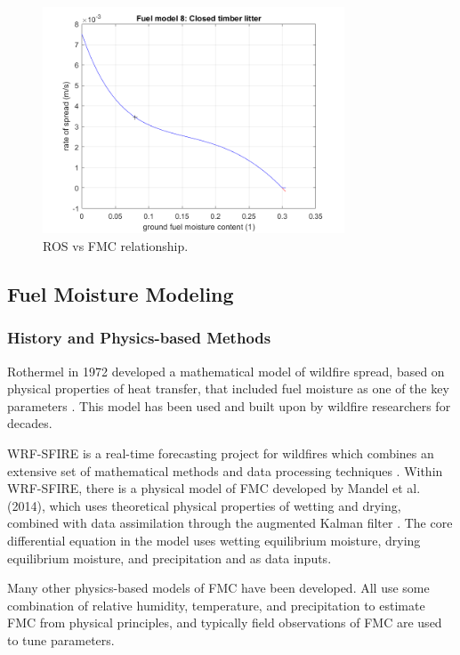 \documentclass[11pt]{article}%
\begin{document}
\begin{figure}[ht]
    \centering
    \includegraphics[width=0.8\textwidth]{images/fuel8_ros_fm.png}
    \caption{ROS vs FMC relationship.}
    \label{fig:fmc_ros_fmc}
\end{figure}

\subsection{Fuel Moisture Modeling}
\subsubsection{History and Physics-based Methods}

Rothermel in 1972 developed a mathematical model of wildfire spread, based on physical properties of heat transfer, that included fuel moisture as one of the key parameters \cite{Rothermel-1972-MMP}. This model has been used and built upon by wildfire researchers for decades. 

WRF-SFIRE is a real-time forecasting project for wildfires which combines an extensive set of mathematical methods and data processing techniques \cite{OpenWFM-2024-HTD}. Within WRF-SFIRE, there is a physical model of FMC developed by Mandel et al. (2014), which uses theoretical physical properties of wetting and drying, combined with data assimilation through the augmented Kalman filter \cite{Mandel-2014-RAA}. The core differential equation in the model uses wetting equilibrium moisture, drying equilibrium moisture, and precipitation and as data inputs.

Many other physics-based models of FMC have been developed. All use some combination of relative humidity, temperature, and precipitation to estimate FMC from physical principles, and typically field observations of FMC are used to tune parameters. \cite{Catchpole-1999-EFR,Nelson-2000-PDC, vanderKamp-2017-MFS}
\end{document}
